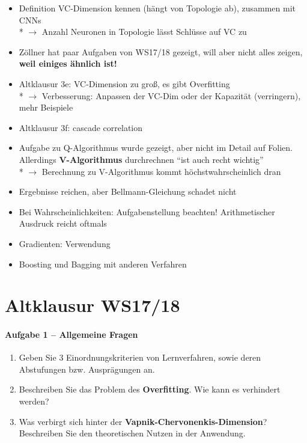 \documentclass[fleqn]{latex-classes/summary}
\begin{document}
\begin{itemize}
  \item Definition VC-Dimension kennen (hängt von Topologie ab), zusammen mit CNNs \\*
    \( \to \) Anzahl Neuronen in Topologie lässt Schlüsse auf VC zu
  \item Zöllner hat paar Aufgaben von WS17/18 gezeigt, will aber nicht alles zeigen, \textbf{weil einiges ähnlich ist!}
  \item Altklausur 3e: VC-Dimension zu groß, es gibt Overfitting \\*
    \( \to \) Verbesserung: Anpassen der VC-Dim oder der Kapazität (verringern), mehr Beispiele
  \item Altklausur 3f: cascade correlation
  \item Aufgabe zu Q-Algorithmus wurde gezeigt, aber nicht im Detail auf Folien. Allerdings \textbf{V-Algorithmus} durchrechnen ``ist auch recht wichtig'' \\*
    \( \to \) Berechnung zu V-Algorithmus kommt höchstwahrscheinlich dran
  \item Ergebnisse reichen, aber Bellmann-Gleichung schadet nicht
  \item Bei Wahrscheinlichkeiten: Aufgabenstellung beachten! Arithmetischer Ausdruck reicht oftmals
  \item Gradienten: Verwendung
  \item Boosting und Bagging mit anderen Verfahren
\end{itemize}

\newpage

\section*{Altklausur WS17/18}

\paragraph{Aufgabe 1 -- Allgemeine Fragen}

\begin{enumerate}
  \item Geben Sie 3 Einordnungskriterien von Lernverfahren, sowie deren Abstufungen bzw. Ausprägungen an.
  \item Beschreiben Sie das Problem des \textbf{Overfitting}. Wie kann es verhindert werden?
  \item Was verbirgt sich hinter der \textbf{Vapnik-Chervonenkis-Dimension}? Beschreiben Sie den theoretischen Nutzen in der Anwendung.
\end{enumerate}
\end{document}
